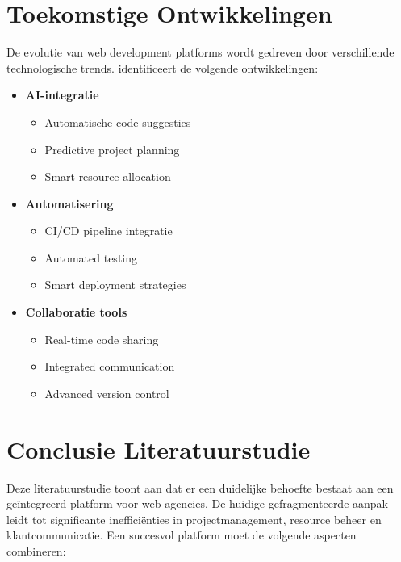 \section{Toekomstige Ontwikkelingen}
\label{sec:toekomst}

De evolutie van web development platforms wordt gedreven door verschillende technologische trends. \textcite{Chen2024a} identificeert de volgende ontwikkelingen:

\begin{itemize}
    \item \textbf{AI-integratie}
    \begin{itemize}
        \item Automatische code suggesties
        \item Predictive project planning
        \item Smart resource allocation
    \end{itemize}
    
    \item \textbf{Automatisering}
    \begin{itemize}
        \item CI/CD pipeline integratie
        \item Automated testing
        \item Smart deployment strategies
    \end{itemize}
    
    \item \textbf{Collaboratie tools}
    \begin{itemize}
        \item Real-time code sharing
        \item Integrated communication
        \item Advanced version control
    \end{itemize}
\end{itemize}

\section{Conclusie Literatuurstudie}
\label{sec:conclusie}

Deze literatuurstudie toont aan dat er een duidelijke behoefte bestaat aan een geïntegreerd platform voor web agencies. De huidige gefragmenteerde aanpak leidt tot significante inefficiënties in projectmanagement, resource beheer en klantcommunicatie. Een succesvol platform moet de volgende aspecten combineren:

